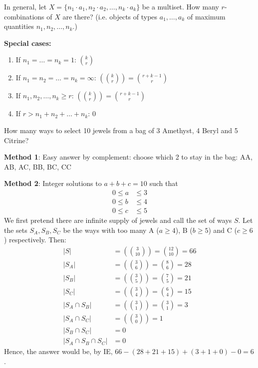 \documentclass[12pt]{article}
\begin{document}
In general, let $X=\{n_1\cdot a_1,n_2\cdot a_2,\dots, n_k\cdot a_k\}$ be a multiset. How many $r$-combinations of $X$ are there? (i.e. objects of types $a_1,\dots,a_k$ of maximum quantities $n_1,n_2,\dots,n_k$.)

\textbf{Special cases:} \begin{enumerate}
    \item If $n_1=\dots=n_k=1$: \hfill$k\choose r$
    \item If $n_1=n_2=\dots=n_k=\infty$: \hfill$\left({k\choose r}\right) = {r+k-1\choose r}$
    \item If $n_1,n_2,\dots,n_k\geq r$: \hfill$\left({k\choose r}\right) = {r+k-1\choose r}$
    \item If $r>n_1+n_2+\dots+n_k$: \hfill0
\end{enumerate}

\eg How many ways to select 10 jewels from a bag of 3 Amethyst, 4 Beryl and 5 Citrine?

\textbf{Method 1}: Easy answer by complement: choose which 2 to stay in the bag: AA, AB, AC, BB, BC, CC\hfill {}

\textbf{Method 2}: Integer solutions to $a+b+c=10$ such that \begin{align*}
    0\leq a&\leq 3\\
    0\leq b&\leq 4\\
    0\leq c&\leq 5
\end{align*}
We first pretend there are infinite supply of jewels and call the set of ways $S$. Let the sets $S_A,S_B,S_C$ be the ways with too many A ($a\geq 4$), B ($b\geq 5$) and C ($c\geq 6$) respectively. Then:
\begin{align*}
    |S| &= \left({3\choose 10}\right) = {12\choose 10} = 66\\
    |S_A| &= \left({3\choose 6}\right) = {8\choose 6} = 28\\
    |S_B| &= \left({3\choose 5}\right) = {7\choose 5} = 21\\
    |S_C| &= \left({3\choose 4}\right) = {6\choose 4} = 15\\
    |S_A\cap S_B| &= \left({3\choose 1}\right) = {3\choose 1} = 3\\
    |S_A\cap S_C| &= \left({3\choose 0}\right) = 1\\
    |S_B\cap S_C| &= 0\\
    |S_A\cap S_B\cap S_C| &= 0
\end{align*}
Hence, the answer would be, by IE, $66-(28+21+15)+(3+1+0)-0=6$.
\end{document}
